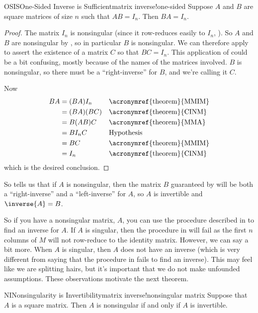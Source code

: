 %
%
\begin{theorem}{OSIS}{One-Sided Inverse is Sufficient}{matrix inverse!one-sided}
Suppose $A$ and $B$ are  square matrices of size $n$ such that $AB=I_n$.  Then $BA=I_n$.
\end{theorem}
%
\begin{proof}
The matrix $I_n$ is nonsingular (since it row-reduces easily to $I_n$, ).  So $A$ and $B$ are nonsingular by , so in particular $B$ is nonsingular.  We can therefore apply  to assert the existence of a matrix $C$ so that $BC=I_n$.  This application of  could be a bit confusing, mostly because of the names of the matrices involved.  $B$ is nonsingular, so there must be a ``right-inverse'' for $B$, and we're calling it $C$.\par
%
Now
%
\begin{align*}
BA
&=(BA)I_n&&\text{\acronymref{theorem}{MMIM}}\\
&=(BA)(BC)&&\text{\acronymref{theorem}{CINM}}\\
&=B(AB)C&&\text{\acronymref{theorem}{MMA}}\\
&=BI_nC&&\text{Hypothesis}\\
&=BC&&\text{\acronymref{theorem}{MMIM}}\\
&=I_n&&\text{\acronymref{theorem}{CINM}}
\end{align*}
%
which is the desired conclusion.
%
\end{proof}
%
So  tells us that if $A$ is nonsingular, then the matrix $B$ guaranteed by  will be both a ``right-inverse'' and a ``left-inverse'' for $A$, so $A$ is invertible and $\inverse{A}=B$.\par
%
So if you have a nonsingular matrix, $A$, you can use the procedure described in  to find an inverse for $A$.  If $A$ is singular, then the procedure in  will fail as the first $n$ columns of $M$ will not row-reduce to the identity matrix.  However, we can say a bit more.  When $A$ is singular, then $A$ does not have an inverse (which is very different from saying that the procedure in  fails to find an inverse).
This may feel like we are splitting hairs, but it's important that we do not make unfounded assumptions.  These observations motivate the next theorem.
%
\begin{theorem}{NI}{Nonsingularity is Invertibility}{matrix inverse!nonsingular matrix}
Suppose that $A$ is a square matrix.  Then $A$ is nonsingular if and only if $A$ is invertible.
\end{theorem}
